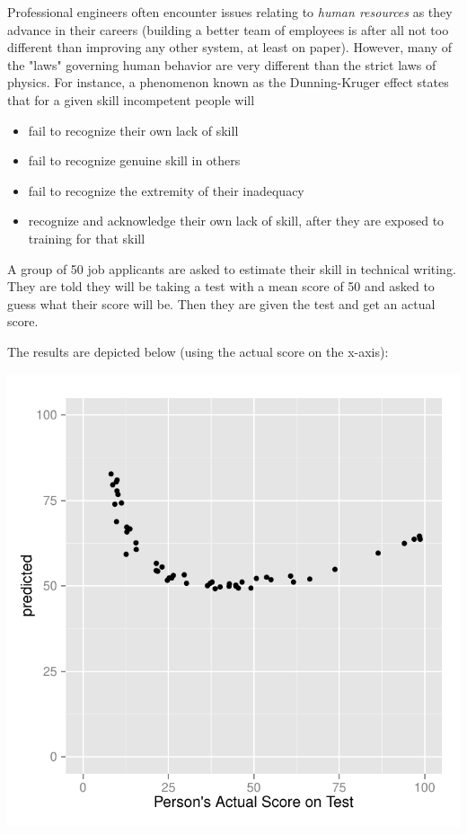 \documentclass{examsetup}\usepackage[]{graphicx}\usepackage[]{color}
\newenvironment{knitrout}{}{} %
\begin{document}
\begin{questions}
\begin{parts}
\begin{solution}
\end{solution}

\end{parts}
\pagebreak

\question

Professional engineers often encounter issues relating to \textit{human resources} as they advance in their careers
(building a better team of employees is after all not too different than improving any other system, at least on paper).
However, many of the "laws" governing human behavior are very different than the strict laws of physics.
For instance, a phenomenon known as the Dunning-Kruger effect states that for a given skill incompetent people will
\begin{itemize}
   \item fail to recognize their own lack of skill
   \item fail to recognize genuine skill in others
   \item fail to recognize the extremity of their inadequacy
   \item recognize and acknowledge their own lack of skill, after they are exposed to training for that skill
\end{itemize}

A group of 50 job applicants are asked to estimate their skill in technical writing. 
They are told they will be taking a test with a mean score of 50 and asked to guess what their score will be.
Then they are given the test and get an actual score. 



The results are depicted below (using the actual score on the x-axis):
\begin{center}
\begin{knitrout}
\color{fgcolor}
\includegraphics[width=.5\linewidth]{figure/unnamed-chunk-11-1} 


\end{knitrout}
\end{center}
\end{questions}
\end{document}
